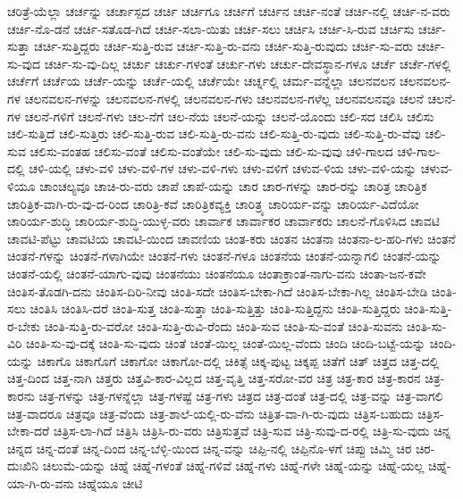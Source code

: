 {ಚರಿತ್ರೆ-ಯೆಲ್ಲಾ
ಚರ್ಚನ್ನು
ಚರ್ಚಾಸ್ಪದ
ಚರ್ಚಿ
ಚರ್ಚಿಗೂ
ಚರ್ಚಿಗೆ
ಚರ್ಚಿನ
ಚರ್ಚಿ-ನಂತೆ
ಚರ್ಚಿ-ನಲ್ಲಿ
ಚರ್ಚಿ-ನ-ವರು
ಚರ್ಚಿ-ನೊ-ಡನೆ
ಚರ್ಚಿ-ಸತೊಡ-ಗಿದೆ
ಚರ್ಚಿ-ಸಲಾ-ಯಿತು
ಚರ್ಚಿ-ಸಲು
ಚರ್ಚಿಸಿ
ಚರ್ಚಿ-ಸಿ-ರುವ
ಚರ್ಚಿಸು
ಚರ್ಚಿ-ಸುತ್ತಾ
ಚರ್ಚಿ-ಸುತ್ತಿದ್ದರು
ಚರ್ಚಿ-ಸುತ್ತಿ-ರುವ
ಚರ್ಚಿ-ಸುತ್ತಿ-ರು-ವನು
ಚರ್ಚಿ-ಸುತ್ತಿ-ರುವುದು
ಚರ್ಚಿ-ಸು-ವರು
ಚರ್ಚಿ-ಸು-ವುದ
ಚರ್ಚಿ-ಸು-ವು-ದಿಲ್ಲ
ಚರ್ಚು
ಚರ್ಚು-ಗಳಂತೆ
ಚರ್ಚು-ಗಳು
ಚರ್ಚು-ದೇವಸ್ಥಾನ-ಗಳೂ
ಚರ್ಚೆ
ಚರ್ಚೆ-ಗಳಲ್ಲಿ
ಚರ್ಚೆಗೆ
ಚರ್ಚೆಯ
ಚರ್ಚೆ-ಯನ್ನು
ಚರ್ಚೆ-ಯಲ್ಲಿ
ಚರ್ಚೆಯೇ
ಚರ್ಚ್ನಲ್ಲಿ
ಚರ್ಮ-ವನ್ನೆಲ್ಲಾ
ಚಲನವಲನ
ಚಲನವಲನ-ಗಳ
ಚಲನವಲನ-ಗಳನ್ನು
ಚಲನವಲನ-ಗಳಲ್ಲಿ
ಚಲನವಲನ-ಗಳು
ಚಲನವಲನ-ಗಳೆಲ್ಲ
ಚಲನವಲನವೂ
ಚಲನೆ
ಚಲನೆ-ಗಳ
ಚಲನೆ-ಗಳಿಗೆ
ಚಲನೆ-ಗಳು
ಚಲ-ನೆಗೆ
ಚಲ-ನೆಯ
ಚಲನೆ-ಯನ್ನು
ಚಲನೆ-ಯೊಂದು
ಚಲಿ-ಸದ
ಚಲಿಸಿ
ಚಲಿಸು
ಚಲಿ-ಸುತ್ತಿದೆ
ಚಲಿ-ಸುತ್ತಿರು
ಚಲಿ-ಸುತ್ತಿ-ರುವ
ಚಲಿ-ಸುತ್ತಿ-ರು-ವನು
ಚಲಿ-ಸುತ್ತಿ-ರು-ವುದು
ಚಲಿ-ಸುತ್ತಿ-ರು-ವೆವು
ಚಲಿ-ಸುವ
ಚಲಿಸು-ವಂತಹ
ಚಲಿಸು-ವಂತೆ
ಚಲಿಸು-ವಂತೆಯೇ
ಚಲಿ-ಸು-ವುದು
ಚಲಿ-ಸು-ವುವು
ಚಳಿ-ಗಾಲದ
ಚಳಿ-ಗಾಲ-ದಲ್ಲಿ
ಚಳಿ-ಯಲ್ಲಿ
ಚಳು-ವಳಿ
ಚಳು-ವಳಿ-ಗಳ
ಚಳು-ವಳಿ-ಗಳು
ಚಳು-ವಳಿಗೆ
ಚಳುವ-ಳಿಯ
ಚಳು-ವಳಿ-ಯನ್ನು
ಚಳುವ-ಳಿಯೂ
ಚಾಂಚಲ್ಯವೂ
ಚಾಚಿ-ರು-ವರು
ಚಾಪೆ
ಚಾಪೆ-ಯನ್ನು
ಚಾರ
ಚಾರ-ಗಳನ್ನು
ಚಾರ-ರನ್ನು
ಚಾರಿತ್ರ
ಚಾರಿತ್ರಿಕ
ಚಾರಿತ್ರಿಕ-ವಾಗಿ-ರು-ವು-ದ-ರಿಂದ
ಚಾರಿತ್ರಿ-ಕವೆ
ಚಾರಿತ್ರಿಕವ್ಯಕ್ತಿ
ಚಾರಿತ್ರ್ಯ
ಚಾರಿರ್ಯ-ವನ್ನು
ಚಾರಿರ್ಯ-ವಿದೆಯೋ
ಚಾರಿರ್ಯ-ಶುದ್ಧಿ
ಚಾರಿರ್ಯ-ಶುದ್ಧಿ-ಯುಳ್ಳ-ವರು
ಚಾರ್ವಾಕ
ಚಾರ್ವಾಕರ
ಚಾರ್ವಾಕರು
ಚಾಲನೆ-ಗೊಳಿಸಿದ
ಚಾವಟಿ
ಚಾವಟಿ-ಪೆಟ್ಟು
ಚಾವಟಿಯ
ಚಾವಟಿ-ಯಿಂದ
ಚಾವಣಿಯ
ಚಿಂತ-ಕರು
ಚಿಂತನ
ಚಿಂತನಾ
ಚಿಂತನಾ-ಲ-ಹರಿ-ಗಳು
ಚಿಂತನೆ
ಚಿಂತನೆ-ಗಳನ್ನು
ಚಿಂತನೆ-ಗಳಾಗಿಯೇ
ಚಿಂತನೆ-ಗಳು
ಚಿಂತನೆ-ಗಳೂ
ಚಿಂತನೆಯ
ಚಿಂತನೆ-ಯನ್ನಾಗಲಿ
ಚಿಂತನೆ-ಯನ್ನು
ಚಿಂತನೆ-ಯಲ್ಲಿ
ಚಿಂತನೆ-ಯಾಗು-ವುವು
ಚಿಂತನೆಯು
ಚಿಂತನೆಯೂ
ಚಿಂತಾಕ್ರಾಂತ-ನಾಗು-ವನು
ಚಿಂತಾ-ಜನ-ಕವೇ
ಚಿಂತಿಸ-ತೊಡಗಿ-ದನು
ಚಿಂತಿಸ-ದಿರಿ-ನೀವು
ಚಿಂತಿ-ಸದೇ
ಚಿಂತಿಸ-ಬೇಕಾ-ಗಿದೆ
ಚಿಂತಿಸ-ಬೇಕಾ-ಗಿಲ್ಲ
ಚಿಂತಿಸ-ಬೇಡಿ
ಚಿಂತಿ-ಸಲು
ಚಿಂತಿಸಿ
ಚಿಂತಿಸಿ-ದರೆ
ಚಿಂತಿ-ಸುತ್ತ
ಚಿಂತಿ-ಸುತ್ತಾ
ಚಿಂತಿ-ಸುತ್ತಿತ್ತು
ಚಿಂತಿ-ಸುತ್ತಿದ್ದನು
ಚಿಂತಿ-ಸುತ್ತಿದ್ದರು
ಚಿಂತಿ-ಸುತ್ತಿ-ರ-ಬೇಕು
ಚಿಂತಿ-ಸುತ್ತಿ-ರು-ವರೋ
ಚಿಂತಿ-ಸುತ್ತಿ-ರುವಿ-ರೆಂದು
ಚಿಂತಿ-ಸುವ
ಚಿಂತಿ-ಸು-ವಂತೆ
ಚಿಂತಿ-ಸುವನು
ಚಿಂತಿ-ಸು-ವಿರಿ
ಚಿಂತಿ-ಸು-ವು-ದಕ್ಕೆ
ಚಿಂತಿ-ಸು-ವುದು
ಚಿಂತೆ
ಚಿಂತೆ-ಯಿಲ್ಲ
ಚಿಂತೆ-ಯಿಲ್ಲ-ವೆಂದು
ಚಿಂದಿ
ಚಿಂದಿ-ಬಟ್ಟೆ-ಯನ್ನು
ಚಿಂದಿ-ಯನ್ನು
ಚಿಕಾಗೊ
ಚಿಕಾಗೊಗೆ
ಚಿಕಾಗೋ
ಚಿಕಾಗೋ-ದಲ್ಲಿ
ಚಿಕಿತ್ಸೆ
ಚಿಕ್ಕ-ಪುಟ್ಟ
ಚಿಕ್ಕಪ್ಪ
ಚಿತೆಗೆ
ಚಿತ್
ಚಿತ್ತದ
ಚಿತ್ತ-ದಲ್ಲಿ
ಚಿತ್ತ-ದಿಂದ
ಚಿತ್ತ-ನಾಗಿ
ಚಿತ್ತರು
ಚಿತ್ತವಿ-ಕಾರ-ವಿಲ್ಲದ
ಚಿತ್ತ-ವೃತ್ತಿ
ಚಿತ್ತ-ಸರೋ-ವರ
ಚಿತ್ರ
ಚಿತ್ರ-ಕಾರ
ಚಿತ್ರ-ಕಾರನ
ಚಿತ್ರ-ಕಾರನು
ಚಿತ್ರ-ಗಳನ್ನು
ಚಿತ್ರ-ಗಳನ್ನೆಲ್ಲಾ
ಚಿತ್ರ-ಗಳಷ್ಟೆ
ಚಿತ್ರ-ಗಳು
ಚಿತ್ರದ
ಚಿತ್ರ-ದಂತೆ
ಚಿತ್ರ-ದಲ್ಲಿ
ಚಿತ್ರ-ವನ್ನು
ಚಿತ್ರ-ವಾಗಲಿ
ಚಿತ್ರ-ವಾದರೂ
ಚಿತ್ರವೂ
ಚಿತ್ರ-ವೆಂದು
ಚಿತ್ರ-ಶಾಲೆ-ಯಲ್ಲಿ-ರು-ವೆನು
ಚಿತ್ರಿತ-ವಾ-ಗಿ-ರು-ವುದು
ಚಿತ್ರಿಸ-ಬಹುದು
ಚಿತ್ರಿಸ-ಬೇಕಾ-ದರೆ
ಚಿತ್ರಿಸ-ಲಾ-ಗಿದೆ
ಚಿತ್ರಿಸಿ
ಚಿತ್ರಿಸಿ-ರು-ವರು
ಚಿತ್ರಿಸುತ್ತವೆ
ಚಿತ್ರಿ-ಸುವ
ಚಿತ್ರಿ-ಸುವು-ದ-ರಲ್ಲಿ
ಚಿತ್ರಿ-ಸು-ವುದು
ಚಿನ್ನ
ಚಿನ್ನದ
ಚಿನ್ನ-ದಂತೆ
ಚಿನ್ನ-ದಿಂದ
ಚಿನ್ನ-ಬೆಳ್ಳಿ-ಯಿಂದ
ಚಿನ್ನ-ವನ್ನು
ಚಿಪ್ಪಿ-ನಲ್ಲಿ
ಚಿಪ್ಪಿನೊ-ಳಗೆ
ಚಿಪ್ಪು
ಚಿಮ್ಮಿ
ಚಿರ
ಚಿರ-ದುಃಖಿನಿ
ಚಿಲುಮೆ-ಯನ್ನು
ಚಿಹ್ನೆ
ಚಿಹ್ನೆ-ಗಳಂತೆ
ಚಿಹ್ನೆ-ಗಳಿವೆ
ಚಿಹ್ನೆ-ಗಳು
ಚಿಹ್ನೆ-ಗಳೇ
ಚಿಹ್ನೆ-ಯನ್ನು
ಚಿಹ್ನೆ-ಯಲ್ಲ
ಚಿಹ್ನೆ-ಯಾ-ಗಿ-ರು-ವನು
ಚಿಹ್ನೆಯೂ
ಚೀಟಿ
}
